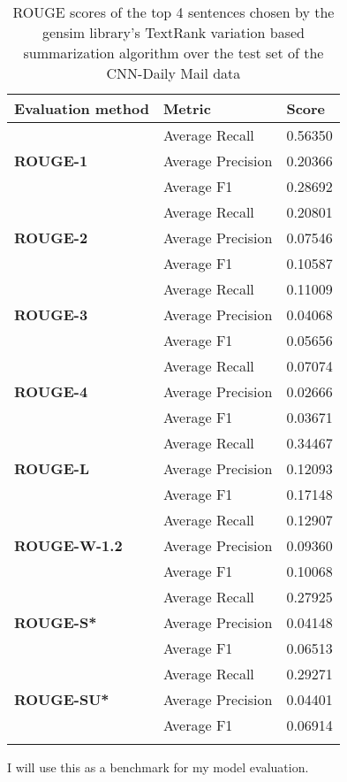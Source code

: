 {\begin{longtable}{| l | l | l |}
	\hline
	\textbf{Evaluation method}&\textbf{Metric}&\textbf{Score}\\ \hline \hline
	\multirow{3}{*}{\textbf{ROUGE-1}}
		&Average Recall&0.56350 \\
		&Average Precision&0.20366  \\
		&Average F1&0.28692  \\ \hline \hline
	\multirow{3}{*}{\textbf{ROUGE-2}}
		&Average Recall&0.20801 \\
		&Average Precision&0.07546 \\
		&Average F1&0.10587 \\ \hline \hline
	\multirow{3}{*}{\textbf{ROUGE-3}}
		&Average Recall&0.11009 \\
		&Average Precision&0.04068 \\
		&Average F1&0.05656 \\ \hline \hline
	\multirow{3}{*}{\textbf{ROUGE-4}}
		&Average Recall&0.07074 \\
		&Average Precision&0.02666 \\
		&Average F1&0.03671 \\ \hline \hline
	\multirow{3}{*}{\textbf{ROUGE-L}}
		&Average Recall&0.34467 \\
		&Average Precision&0.12093 \\
		&Average F1&0.17148 \\ \hline \hline
	\multirow{3}{*}{\textbf{ROUGE-W-1.2}}
		&Average Recall&0.12907 \\
		&Average Precision&0.09360 \\
		&Average F1&0.10068 \\ \hline \hline
	\multirow{3}{*}{\textbf{ROUGE-S*}}
		&Average Recall&0.27925 \\
		&Average Precision&0.04148 \\
		&Average F1&0.06513 \\ \hline \hline
	\multirow{3}{*}{\textbf{ROUGE-SU*}}
		&Average Recall&0.29271 \\
		&Average Precision&0.04401 \\
		&Average F1&0.06914 \\ \hline
	\caption{ROUGE scores of the top 4 sentences chosen by the gensim library's TextRank variation based summarization algorithm over the test set of the CNN-Daily Mail data}
\end{longtable}

I will use this as a benchmark for my model evaluation.

}
